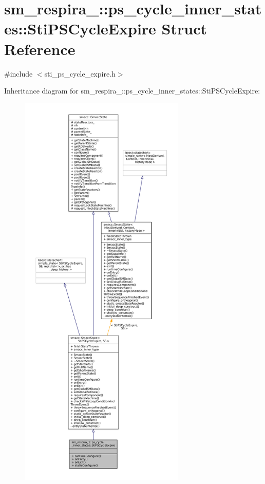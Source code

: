 \hypertarget{structsm__respira__1_1_1ps__cycle__inner__states_1_1StiPSCycleExpire}{}\section{sm\+\_\+respira\+\_\+:\+:ps\+\_\+cycle\+\_\+inner\+\_\+states\+:\+:Sti\+P\+S\+Cycle\+Expire Struct Reference}
\label{structsm__respira__1_1_1ps__cycle__inner__states_1_1StiPSCycleExpire}


{\ttfamily \#include $<$sti\+\_\+ps\+\_\+cycle\+\_\+expire.\+h$>$}



Inheritance diagram for sm\+\_\+respira\+\_\+:\+:ps\+\_\+cycle\+\_\+inner\+\_\+states\+:\+:Sti\+P\+S\+Cycle\+Expire\+:
\nopagebreak
\begin{figure}[H]
\begin{center}
\leavevmode
\includegraphics[height=550pt]{structsm__respira__1_1_1ps__cycle__inner__states_1_1StiPSCycleExpire__inherit__graph}
\end{center}
\end{figure}


